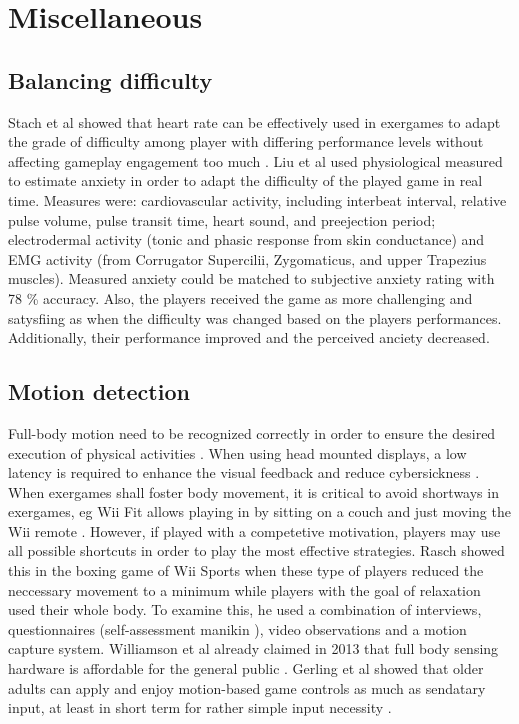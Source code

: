 \chapter{Miscellaneous}


\section{Balancing difficulty}
Stach et al showed that heart rate can be effectively used in exergames to adapt the grade of difficulty among player with differing performance levels without affecting gameplay engagement too much \cite{stach2009heart}.
Liu et al \cite{liu2009dynamic} used physiological measured to estimate anxiety in order to adapt the difficulty of the played game in real time. Measures were: cardiovascular activity, including interbeat interval, relative pulse volume, pulse transit time, heart sound, and preejection period; electrodermal activity (tonic and phasic response from skin conductance) and EMG activity (from Corrugator Supercilii, Zygomaticus, and upper Trapezius muscles). Measured anxiety could be matched to subjective anxiety rating with 78 \% accuracy. Also, the players received the game as more challenging and satysfiing as when the difficulty was changed based on the players performances. Additionally, their performance improved and the perceived anciety decreased.

\section{Motion detection}
Full-body motion need to be recognized correctly in order to ensure the desired execution of physical activities \cite{casermanfull}.
When using head mounted displays, a low latency is required to enhance the visual feedback and reduce cybersickness \cite{casermanfull}.
When exergames shall foster body movement, it is critical to avoid shortways in exergames, eg Wii Fit allows playing in by sitting on a couch and just moving the Wii remote \cite{laamarti2014overview}. However, if played with a competetive motivation, players may use all possible shortcuts in order to play the most effective strategies. Rasch showed this \cite{pasch2009movement} in the boxing game of Wii Sports when these type of players reduced the neccessary movement to a minimum while players with the goal of relaxation used their whole body. To examine this, he used a combination of interviews, questionnaires (self-assessment manikin \cite{bradley1994measuring}), video observations and a motion capture
system.
Williamson et al already claimed in 2013 that full body sensing hardware is affordable for the general public \cite{williamson2013full}.
Gerling et al showed that older adults can apply and enjoy motion-based game controls as much as sendatary input, at least in short term for rather simple input necessity \cite{gerling2013movement}.

